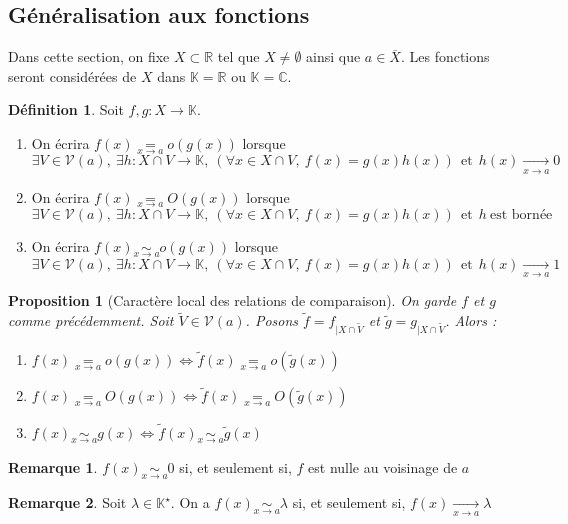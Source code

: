 \documentclass[french]{book}
\newcommand{\R}{\mathbb{R}}
\newcommand{\C}{\mathbb{C}}
\newcommand{\K}{\mathbb{K}}
\newcommand{\st}{^\star}
\theoremstyle{plain}
\newtheorem{prop}{Proposition}[chapter]
\theoremstyle{definition}
\newtheorem{dfn}{Définition}[chapter]
\newtheorem{rmq}{Remarque}[chapter]
\theoremstyle{remark}
\begin{document}
\subsection{Généralisation aux fonctions}
Dans cette section, on fixe $X\subset\R$ tel que $X\ne\emptyset$ ainsi que $a\in\overline{X}$. Les fonctions seront considérées de $X$ dans $\K=\R$ ou $\K=\C$.
\begin{dfn}
	Soit $f,g:X\rightarrow\K$. 
	\begin{enumerate}
		\item On écrira $f(x)\underset{x\to a}{=}o\left(g(x)\right)$ lorsque $$\exists V\in\mathcal{V}(a),\ \exists h:X\cap V\rightarrow\K,\ \left(\forall x\in X\cap V,\ f(x)=g(x)h(x)\right) \ \ \text{et} \ \ h(x)\xrightarrow[x\to a]{} 0$$
		\item On écrira $f(x)\underset{x\to a}{=}O\left(g(x)\right)$ lorsque $$\exists V\in\mathcal{V}(a),\ \exists h:X\cap V\rightarrow\K,\ \left(\forall x\in X\cap V,\ f(x)=g(x)h(x)\right) \ \ \text{et} \ \ h \ \text{est bornée}$$
		\item On écrira $f(x)\underset{x\to a}{\sim}o\left(g(x)\right)$ lorsque $$\exists V\in\mathcal{V}(a),\ \exists h:X\cap V\rightarrow\K,\ \left(\forall x\in X\cap V,\ f(x)=g(x)h(x)\right) \ \ \text{et} \ \ h(x)\xrightarrow[x\to a]{} 1$$
	\end{enumerate}
\end{dfn}
\begin{prop}[Caractère local des relations de comparaison]
	On garde $f$ et $g$ comme précédemment. Soit $\tilde{V}\in\mathcal{V}(a)$. Posons $\displaystyle \tilde{f}=f_{|X\cap\tilde{V}}$ et $\displaystyle \tilde{g}=g_{|X\cap\tilde{V}}$. Alors :
	\begin{enumerate}
		\item $f(x)\underset{x\to a}{=}o\left(g(x)\right) \Longleftrightarrow \tilde{f}(x)\underset{x\to a}{=}o\left(\tilde{g}(x)\right)$
		\item $f(x)\underset{x\to a}{=}O\left(g(x)\right) \Longleftrightarrow \tilde{f}(x)\underset{x\to a}{=}O\left(\tilde{g}(x)\right)$
		\item $f(x)\underset{x\to a}{\sim}g(x) \Longleftrightarrow \tilde{f}(x)\underset{x\to a}{\sim}\tilde{g}(x)$
	\end{enumerate}
\end{prop}
\begin{rmq}
	$f(x)\underset{x\to a}{\sim} 0$ si, et seulement si, $f$ est nulle au voisinage de $a$
\end{rmq}
\begin{rmq}
	Soit $\lambda\in\K\st$. On a $f(x)\underset{x\to a}{\sim}\lambda$ si, et seulement si, $f(x)\xrightarrow[x\to a]{}\lambda$
\end{rmq}
\end{document}
